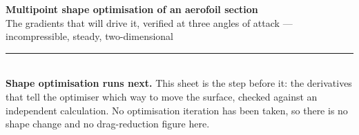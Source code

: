 \documentclass[9pt,a4paper]{article}
\renewcommand{\footnotesize}{\fontsize{6.4}{6.85}\selectfont}
\begin{document}
\fontsize{7.3}{8.5}\selectfont

{\fontsize{13.5}{15}\selectfont\bfseries Multipoint shape optimisation of an
aerofoil section}\\[1.5pt]
{\fontsize{8.6}{10}\selectfont The gradients that will drive it, verified at
three angles of attack --- incompressible, steady, two-dimensional}\\[2pt]
{\color{rulegrey}\rule{\textwidth}{0.9pt}}\\[1pt]
{\footnotesize \textbf{Shape optimisation runs next.} This sheet is the step
before it: the derivatives that tell the optimiser which way to move the
surface, checked against an independent calculation. No optimisation iteration
has been taken, so there is no shape change and no drag-reduction figure here.}
\end{document}
